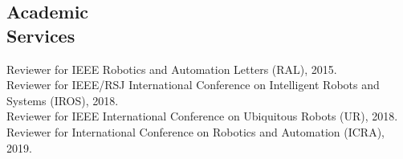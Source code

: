 \documentclass[margin,line]{res}
\begin{document}
\begin{resume}
\section{\sc Academic \\Services}

Reviewer for IEEE Robotics and Automation Letters (RAL), 2015. \\
Reviewer for IEEE/RSJ International Conference on Intelligent Robots and Systems (IROS), 2018. \\
Reviewer for IEEE International Conference on Ubiquitous Robots (UR), 2018.\\
Reviewer for International Conference on Robotics and Automation (ICRA), 2019. \\

\end{resume}
\end{document}
